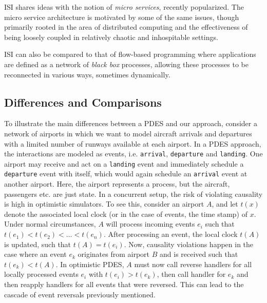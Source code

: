 ISI shares ideas with the notion of \emph{micro
services}\cite{microservices}, recently popularized.
The micro service architecture is motivated by some of the same issues, though
primarily rooted in the area of distributed computing and the effectiveness of
being loosely coupled in relatively chaotic and inhospitable settings.

ISI can also be compared to that of flow-based programming\cite{flowprog} where
applications are defined as a network of \emph{black box} processes, allowing
these processes to be reconnected in various ways, sometimes dynamically.


\subsection{Differences and Comparisons}
\label{sec:diff-comp}
To illustrate the main differences between a PDES and our approach, consider a
network of airports in which we want to model aircraft arrivals and departures
with a limited number of runways available at each airport. In a PDES approach,
the interactions are modeled as events, i.e. \verb|arrival|, \verb|departure|
and \verb|landing|. One airport may receive and act on a \verb|landing| event and
immediately schedule a \verb|departure| event with itself, which would again
schedule an \verb|arrival| event at another airport. Here, the airport
represents a process, but the aircraft, passengers etc. are just state. In a
concurrent setup, the risk of violating causality is high in optimistic
simulators. To see this, consider an airport $A$, and let $t(x)$ denote the
associated local clock (or in the case of events, the time stamp) of $x$. Under
normal circumstances, $A$ will process incoming events $e_i$ such that $t(e_1)
< t(e_2) < \dots < t(e_n)$. After processing an event, the local clock $t(A)$
is updated, such that $t(A) = t(e_i)$. Now, causality violations happen in the
case where an event $e_k$ originates from airport $B$ and is received such that
$t(e_k) < t(A)$. In optimistic PDES, $A$ must now call reverse handlers for all
locally processed events $e_i$ with $t(e_i) > t(e_k)$, then call handler for
$e_k$ and then reapply handlers for all events that were reversed. This can
lead to the cascade of event reversals previously mentioned.

